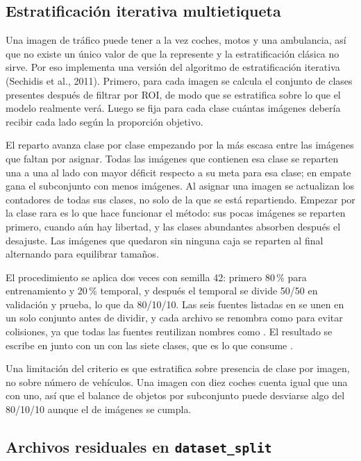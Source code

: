 \documentclass[11pt,a4paper]{article}
\begin{document}
\subsection{Estratificación iterativa multietiqueta}

Una imagen de tráfico puede tener a la vez coches, motos y una ambulancia, así que no existe un único valor de  que la represente y la estratificación clásica no sirve. Por eso  implementa una versión del algoritmo de estratificación iterativa (Sechidis et al., 2011). Primero, para cada imagen se calcula el conjunto de clases presentes después de filtrar por ROI, de modo que se estratifica sobre lo que el modelo realmente verá. Luego se fija para cada clase cuántas imágenes debería recibir cada lado según la proporción objetivo.

El reparto avanza clase por clase empezando por la más escasa entre las imágenes que faltan por asignar. Todas las imágenes que contienen esa clase se reparten una a una al lado con mayor déficit respecto a su meta para esa clase; en empate gana el subconjunto con menos imágenes. Al asignar una imagen se actualizan los contadores de todas sus clases, no solo de la que se está repartiendo. Empezar por la clase rara es lo que hace funcionar el método: sus pocas imágenes se reparten primero, cuando aún hay libertad, y las clases abundantes absorben después el desajuste. Las imágenes que quedaron sin ninguna caja se reparten al final alternando para equilibrar tamaños.

El procedimiento se aplica dos veces con semilla 42: primero 80\,\% para entrenamiento y 20\,\% temporal, y después el temporal se divide 50/50 en validación y prueba, lo que da 80/10/10. Las seis fuentes listadas en  se unen en un solo conjunto antes de dividir, y cada archivo se renombra como  para evitar colisiones, ya que todas las fuentes reutilizan nombres como . El resultado se escribe en  junto con un  con las siete clases, que es lo que consume .

Una limitación del criterio es que estratifica sobre presencia de clase por imagen, no sobre número de vehículos. Una imagen con diez coches cuenta igual que una con uno, así que el balance de objetos por subconjunto puede desviarse algo del 80/10/10 aunque el de imágenes se cumpla.

\subsection{Archivos residuales en \texorpdfstring{\texttt{dataset\_split}}{dataset\_split}}
\end{document}
